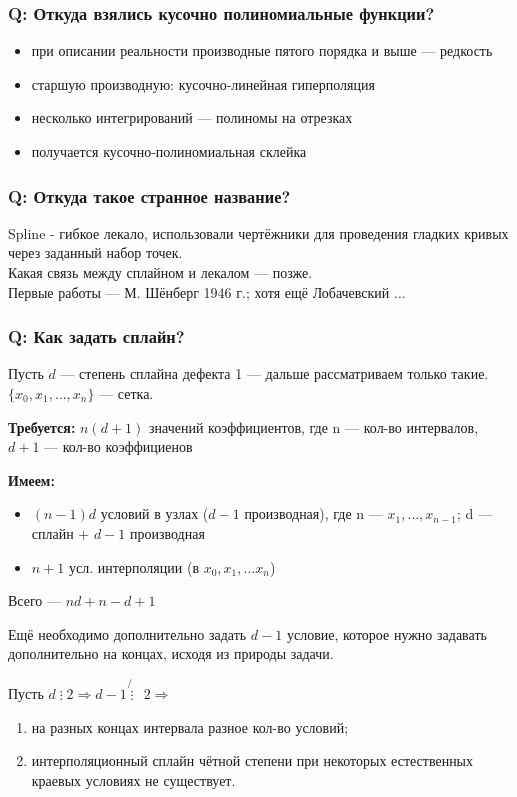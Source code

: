 \subsubsection*{Q: Откуда взялись кусочно полиномиальные функции?}
\begin{itemize}
    \item при описании реальности производные пятого порядка и выше --- редкость
    \item старшую производную: кусочно-линейная гиперполяция
    \item несколько интегрирований --- полиномы на отрезках
    \item получается кусочно-полиномиальная склейка
\end{itemize}

\subsubsection*{Q: Откуда такое странное название?}
Spline - гибкое лекало, использовали чертёжники для проведения гладких кривых через заданный набор точек. \\
Какая связь между сплайном и лекалом --- позже. \\
Первые работы --- М. Шёнберг 1946 г.; хотя ещё Лобачевский $\dots$

\subsubsection*{Q: Как задать сплайн?}
Пусть $d$ --- степень сплайна дефекта 1 --- дальше рассматриваем только такие. \\ $\{x_0, x_1, \ldots, x_n\}$ --- сетка.

\textbf{Требуется:} $n(d+1)$ значений коэффициентов, где n --- кол-во интервалов, $d+1$ --- кол-во коэффициенов

\textbf{Имеем:}
\begin{itemize}
    \item $(n-1)d$ условий в узлах ($d-1$ производная), где n --- $x_1, \ldots, x_{n-1}$; d --- сплайн + $d-1$ производная
    \item $n+1$ усл. интерполяции (в $x_0, x_1, \ldots x_n$)
\end{itemize}

Всего --- $nd+n-d+1$

Ещё необходимо дополнительно задать $d-1$ условие, которое нужно  задавать дополнительно на концах, исходя из природы задачи.

Пусть $d \mathrel{\vdots} 2 \Rightarrow d-1 \not{\mathrel{\vdots}} ~~ 2 \Rightarrow$
\begin{enumerate}
    \item на разных концах интервала разное кол-во условий;
    \item интерполяционный сплайн чётной степени при некоторых естественных краевых условиях не существует.
\end{enumerate}


